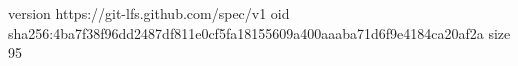 version https://git-lfs.github.com/spec/v1
oid sha256:4ba7f38f96dd2487df811e0cf5fa18155609a400aaaba71d6f9e4184ca20af2a
size 95
